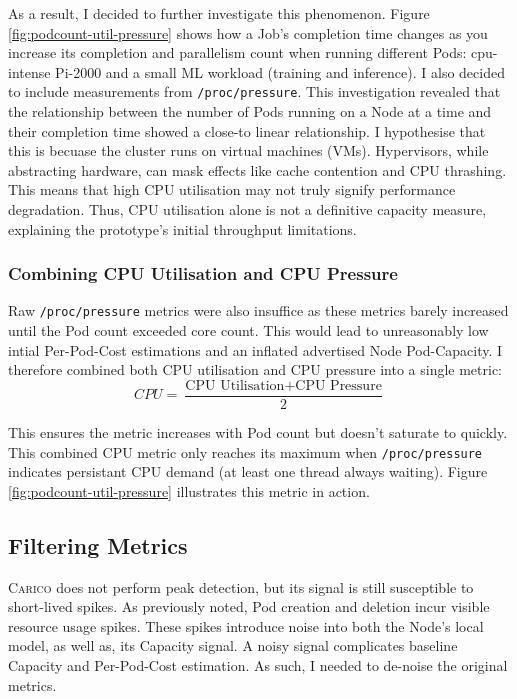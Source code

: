 As a result, I decided to further investigate this phenomenon. Figure
\ref{fig:podcount-util-pressure} shows how a Job's completion time changes as you
increase its completion and parallelism count when running different Pods:
cpu-intense Pi-2000 and a small ML workload (training and inference). I also
decided to include measurements from \verb|/proc/pressure|. This investigation
revealed that the relationship between the number of Pods running on
a Node at a time and their completion time showed a close-to linear
relationship. I hypothesise that this is becuase the cluster runs on virtual
machines (VMs). Hypervisors, while abstracting hardware, can mask effects like
cache contention and CPU thrashing. This means that high  CPU utilisation may
not truly signify performance degradation. Thus, CPU utilisation alone is not a
definitive capacity measure, explaining the prototype's initial throughput
limitations.

\subsubsection{Combining CPU Utilisation and CPU Pressure}
Raw \verb|/proc/pressure| metrics were also insuffice as these metrics
barely increased until the Pod count exceeded core count. This would lead to
unreasonably low intial Per-Pod-Cost estimations and an inflated advertised Node
Pod-Capacity. I therefore combined both CPU utilisation and CPU pressure
into a single metric:
\[ CPU = \frac{\text{CPU Utilisation} + \text{CPU Pressure}}{2} \]

This ensures the metric increases with Pod count but doesn't saturate to
quickly. This combined CPU metric only reaches its maximum when \verb|/proc/pressure|
indicates persistant CPU demand (at least one thread always waiting). Figure
\ref{fig:podcount-util-pressure} illustrates this metric in action.

\subsection{Filtering Metrics}
\textsc{Carico} does not perform peak detection, but its signal is still
susceptible to short-lived spikes. As previously noted,  Pod creation and
deletion incur visible resource usage spikes. These spikes introduce noise
into both the Node's local model, as well as, its Capacity signal. A noisy
signal complicates baseline Capacity and Per-Pod-Cost estimation. As such, I
needed to de-noise the original metrics.

